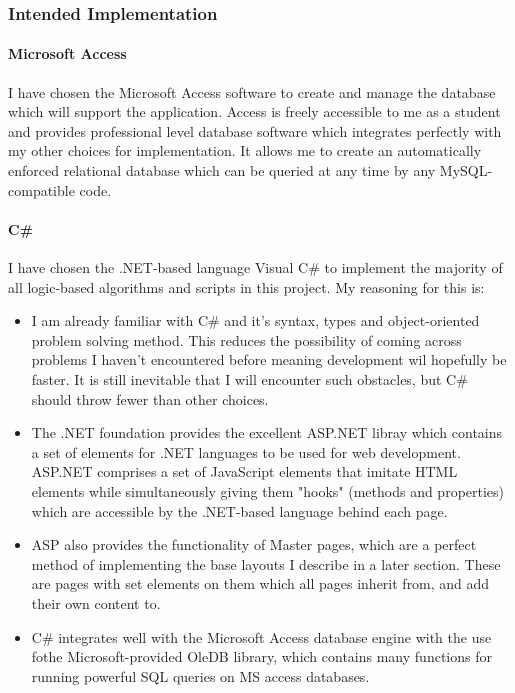 ﻿\documentclass{article}
\begin{document}
    \subsubsection{Intended Implementation}
    \paragraph{Microsoft Access}
    I have chosen the Microsoft Access software to create and manage the database which will support the application.
    Access is freely accessible to me as a student and provides professional level database software which integrates perfectly with my other choices for implementation.
    It allows me to create an automatically enforced relational database which can be queried at any time by any MySQL-compatible code.
    \paragraph{C\#}
    I have chosen the .NET-based language Visual C\# to implement the majority of all logic-based algorithms and scripts in this project.
    My reasoning for this is:
    \begin{itemize}
        \item I am already familiar with C\# and it's syntax, types and object-oriented problem solving method.
        This reduces the possibility of coming across problems I haven't encountered before meaning development wil hopefully be faster.
        It is still inevitable that I will encounter such obstacles, but C\# should throw fewer than other choices.
        \item The .NET foundation provides the excellent ASP.NET libray which contains a set of elements for .NET languages to be used for web development.
        ASP.NET comprises a set of JavaScript elements that imitate HTML elements while simultaneously giving them "hooks" (methods and properties) which are accessible by the .NET-based language behind each page.
        \item ASP also provides the functionality of Master pages, which are a perfect method of implementing the base layouts I describe in a later section.
        These are pages with set elements on them which all pages inherit from, and add their own content to.
        \item C\# integrates well with the Microsoft Access database engine with the use fothe Microsoft-provided OleDB library, which contains many functions for running powerful SQL queries on MS access databases.
    \end{itemize}
\end{document}
